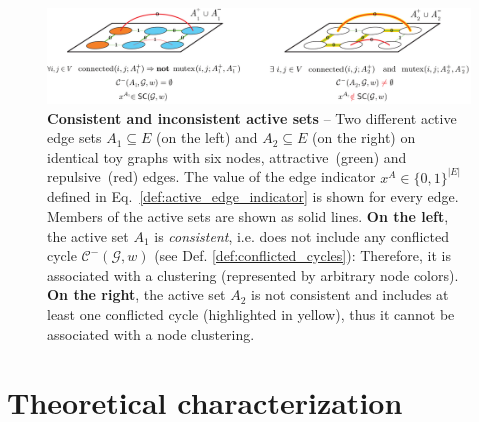 
\begin{figure}[t]
    \centering 
    \includegraphics[width=\linewidth]{figures/MWS/images/consistent-sets-combined.pdf}
    \caption[Consistent and inconsistent active sets]{\textbf{Consistent and inconsistent active sets} -- Two different active edge sets $A_1\subseteq E$ (on the left) and $A_2\subseteq E$ (on the right) on identical toy graphs with six nodes, attractive~(green) and repulsive~(red) edges. The value of the edge indicator $x^A\in \{0,1\}^{|E|}$ defined in Eq.~\ref{def:active_edge_indicator} is shown for every edge. Members of the active sets are shown as solid lines.  \textbf{On the left}, the active set $A_1$ is \emph{consistent}, i.e. does not include any conflicted cycle $\mathcal{C}^-(\mathcal{G},w)$ (see Def. \ref{def:conflicted_cycles}): Therefore, it is associated with a clustering (represented by arbitrary node colors). \textbf{On the right}, the active set $A_2$ is not consistent and includes at least one conflicted cycle (highlighted in yellow), thus it cannot be associated with a node clustering.}
\label{fig:conflicted_cycles}
\end{figure}


\section{Theoretical characterization}\label{sec:MWS_objective}

